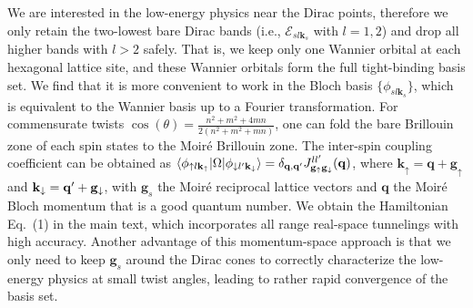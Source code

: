 \documentclass[twocolumn,english,prl,floatfix,citeautoscript,nofootinbib]{revtex4}
\begin{document}
\begin{widetext}
We are interested in the low-energy physics near the Dirac points, therefore
we only retain the two-lowest bare Dirac bands (i.e., $\mathcal{E}_{sl%
\mathbf{k}_{s}}$ with $l=1,2$) and drop all higher bands with $l>2$ safely.
That is, we keep only one Wannier orbital at each hexagonal lattice site,
and these Wannier orbitals form the full tight-binding basis set. We find
that it is more convenient to work in the Bloch basis $\{\phi _{sl\mathbf{k}%
_{s}}\}$, which is equivalent to the Wannier basis up to a Fourier
transformation. For commensurate twists $\cos (\theta )=\frac{n^{2}+m^{2}+4mn%
}{2(n^{2}+m^{2}+mn)}$, one can fold the bare Brillouin zone of each spin
states to the Moir\'{e} Brillouin zone. The inter-spin coupling coefficient
can be obtained as $\langle \phi _{\uparrow l\mathbf{k}_{\uparrow }}|\Omega
|\phi _{\downarrow l^{\prime }\mathbf{k}_{\downarrow }}\rangle =\delta _{%
\mathbf{q},\mathbf{q}^{\prime }}J_{\mathbf{g}_{\uparrow }\mathbf{g}%
_{\downarrow }}^{ll^{\prime }}(\mathbf{q})$, where $\mathbf{k}_{\uparrow }=%
\mathbf{q}+\mathbf{g}_{\uparrow }$ and $\mathbf{k}_{\downarrow }=\mathbf{%
q^{\prime }}+\mathbf{g}_{\downarrow }$, with $\mathbf{g}_{s}$ the Moir\'{e}
reciprocal lattice vectors and $\mathbf{q}$ the Moir\'{e} Bloch momentum
that is a good quantum number. We obtain the Hamiltonian Eq.~(1) in the main
text, which incorporates all range real-space tunnelings with high accuracy.
Another advantage of this momentum-space approach is that we only need to
keep $\mathbf{g}_{s}$ around the Dirac cones to correctly characterize the
low-energy physics at small twist angles, leading to rather rapid
convergence of the basis set.


\end{widetext}
\end{document}
